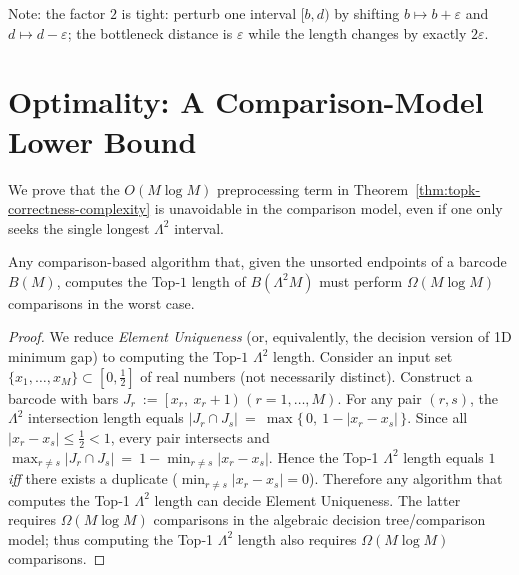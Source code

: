\documentclass[runningheads]{llncs}
\newcommand{\B}{B}
\newcommand{\Lam}{\Lambda}
\begin{document}
Note: the factor $2$ is tight: perturb one interval $[b,d)$ by shifting $b\mapsto b+\varepsilon$
and $d\mapsto d-\varepsilon$; the bottleneck distance is $\varepsilon$ while the length
changes by exactly $2\varepsilon$.

\section{Optimality: A Comparison-Model Lower Bound}\label{sec:lowerbound}

We prove that the $O(M\log M)$ preprocessing term in Theorem~\ref{thm:topk-correctness-complexity} is unavoidable in the comparison model, even if one only seeks the single longest $\Lam^2$ interval.

\begin{proposition}\label{prop:lb}
Any comparison-based algorithm that, given the unsorted endpoints of a barcode $\B(M)$, computes the Top-$1$ length of $\B(\Lam^2 M)$ must perform $\Omega(M\log M)$ comparisons in the worst case.
\end{proposition}

\begin{proof}
We reduce \emph{Element Uniqueness} (or, equivalently, the decision version of 1D minimum gap) to computing the Top-$1$ $\Lam^2$ length. Consider an input set $\{x_1,\dots,x_M\}\subset[0,\tfrac12]$ of real numbers (not necessarily distinct). Construct a barcode with bars
$J_r \ :=\ [\,x_r,\ x_r+1\,)$ $(r=1,\dots,M).$
For any pair $(r,s)$, the $\Lam^2$ intersection length equals
$|J_r\cap J_s|\ =\ \max\{\,0,\ 1-|x_r-x_s|\,\}.$
Since all $|x_r-x_s|\le\tfrac12<1$, every pair intersects and
$\max_{r\neq s}|J_r\cap J_s|\ =\ 1 - \min_{r\neq s}|x_r-x_s|.$
Hence the Top‑1 $\Lam^2$ length equals $1$ \emph{iff} there exists a duplicate ($\min_{r\ne s}|x_r-x_s|=0$). Therefore any algorithm that computes the Top‑1 $\Lam^2$ length can decide Element Uniqueness. The latter requires $\Omega(M\log M)$ comparisons in the algebraic decision tree/comparison model; thus computing the Top‑1 $\Lam^2$ length also requires $\Omega(M\log M)$ comparisons.
\end{proof}

\end{document}
